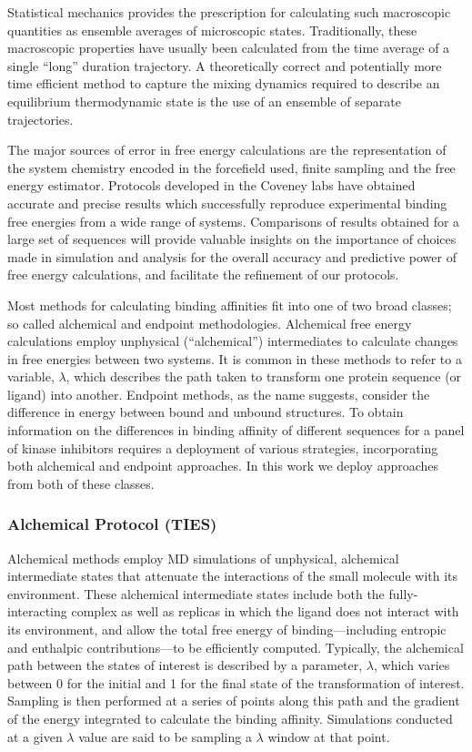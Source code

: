 \documentclass[conference]{IEEEtran}
\begin{document}
Statistical mechanics provides the prescription for calculating such
macroscopic quantities as ensemble averages of microscopic states.
Traditionally, these macroscopic properties have usually been calculated from
the time average of a single “long” duration trajectory. A theoretically correct and
potentially more time efficient method to capture the mixing dynamics required
to describe an equilibrium thermodynamic state is the use of an ensemble of
separate trajectories. \cite{Coveney2016}

The major sources of error in free energy calculations are the representation
of the system chemistry encoded in the forcefield used, finite sampling and
the free energy estimator. Protocols developed in the Coveney labs have
obtained accurate and precise results which successfully reproduce
experimental binding free energies from a wide range of systems.
\cite{Wright2014, Wan2017brd4, Wan2015, Wan2011} Comparisons of results
obtained for a large set of sequences will provide valuable insights on the
importance of choices made in simulation and analysis for the overall accuracy
and predictive power of free energy calculations, and facilitate the
refinement of our protocols.


Most methods for calculating binding affinities fit into one of two broad
classes; so called alchemical and endpoint methodologies. Alchemical free
energy calculations employ unphysical (“alchemical”) intermediates to
calculate changes in free energies between two systems. It is common in these
methods to refer to a variable, $\lambda$, which describes the path taken to
transform one protein sequence (or ligand) into another. Endpoint methods, as
the name suggests, consider the difference in energy between bound and unbound
structures. To obtain information on the differences in binding affinity of
different sequences for a panel of kinase inhibitors requires a deployment of
various strategies, incorporating both alchemical and endpoint approaches. In
this work we deploy approaches from both of these classes.


\subsubsection{Alchemical Protocol (TIES)}\label{sec:ties}

Alchemical methods employ MD simulations of unphysical, alchemical
intermediate states that attenuate the interactions of the small molecule with
its environment. These alchemical intermediate states include both the fully-
interacting complex as well as replicas in which the ligand does not interact
with its environment, and allow the total free energy of binding—including
entropic and enthalpic contributions—to be efficiently computed. Typically,
the alchemical path between the states of interest is described by a
parameter, $\lambda$, which varies between 0 for the initial and 1 for the
final state of the transformation of interest. Sampling is then performed at a
series of points along this path and the gradient of the energy integrated to
calculate the binding affinity. Simulations conducted at a given $\lambda$
value are said to be sampling a $\lambda$ window at that point.
\end{document}
